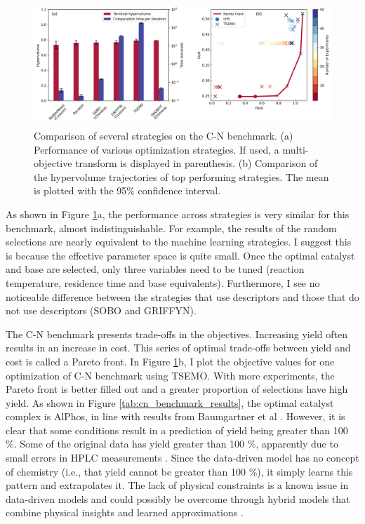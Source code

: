 \begin{figure}
    \centering
    \includegraphics[width=1.2\textwidth]{gfx/Chapter02/cn_hv_time_tradeoff.png}
    \caption{Comparison of several strategies on the C-N benchmark. (a) Performance of various optimization strategies. If used, a multi-objective transform is displayed in parenthesis. (b) Comparison of the hypervolume trajectories of top performing strategies. The mean is plotted with the 95\% confidence interval.}
    \label{fig:cn_hv_time}
\end{figure}

As shown in Figure \ref{fig:cn_hv_time}a, the performance across strategies is very similar for this benchmark, almost indistinguishable. For example, the results of the random selections are nearly equivalent to the machine learning strategies. I suggest this is because the effective parameter space is quite small. Once the optimal catalyst and base are selected, only three variables need to be tuned (reaction temperature, residence time and base equivalents). Furthermore, I see no noticeable difference between the strategies that use descriptors and those that do not use descriptors (SOBO and GRIFFYN).

The C-N benchmark presents trade-offs in the objectives. Increasing yield often results in an increase in cost. This series of optimal trade-offs between yield and cost is called a Pareto front. In Figure \ref{fig:cn_hv_time}b, I plot the objective values for one optimization of C-N benchmark using TSEMO. With more experiments, the Pareto front is better filled out and a greater proportion of selections have high yield. As shown in Figure \ref{tab:cn_benchmark_results}, the optimal catalyst complex is AlPhos, in line with results from Baumgartner et al \cite{Baumgartner2019}. However, it is clear that some conditions result in a prediction of yield being greater than 100 \%. Some of the original data has yield greater than 100 \%, apparently due to small errors in HPLC measurements \cite{Baumgartner2019}. Since the data-driven model has no concept of chemistry (i.e., that yield cannot be greater than 100 \%), it simply learns this pattern and extrapolates it. The lack of physical constraints is a known issue in data-driven models and could possibly be overcome through hybrid models that combine physical insights and learned approximations \cite{Thompson1994, Tsay2019}.


